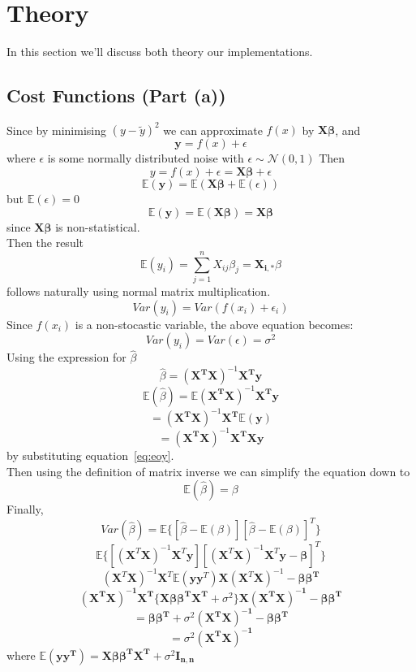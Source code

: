 \documentclass[sigconf, nonacm]{acmart}
\begin{document}
\section{Theory}
In this section we'll  discuss both theory our implementations.
\subsection{Cost Functions (Part (a))}
Since by minimising $ {(y- \tilde y)}^2 $ we can approximate $ f(x) $ by $ \textbf{X} \boldsymbol{\beta}  $, and
\[ \textbf{y} = f(x) + \epsilon \] where $ \epsilon $ is some normally distributed noise with $ \epsilon \sim \mathcal{N}(0,1)  $
Then 
\[ y = f(x) + \epsilon = \textbf{X} \boldsymbol{\beta} + \epsilon  \]  
\[ \mathbb{E}(\boldsymbol{y}) = \mathbb{E}(\boldsymbol{X \beta} + \mathbb{E}(\epsilon)) \] 
but $ \mathbb{E}(\epsilon) = 0 $ 
\[ \mathbb{E}(\boldsymbol{y}) = \mathbb{E}(\boldsymbol{X \beta}) = \boldsymbol{X \beta} \]
since $ \boldsymbol{X \beta} $ is non-statistical. \\
Then the result
\begin{equation}
	\label{eq:eoy}
	\mathbb{E}(y_i) = \sum_{j=1}^{n} X_{ij} \beta_j = \boldsymbol{X_{i,*}} \beta
\end{equation}
follows naturally using normal matrix multiplication. \\
\[ Var(y_i) = Var(f(x_i) + \epsilon_i) \] 
Since $ f(x_i) $ is a non-stocastic variable, the above equation becomes:
\begin{equation}
	Var(y_i) = Var(\epsilon) = \sigma^2
\end{equation}
Using the expression for $ \hat \beta $ 
\[ \hat \beta = {(\boldsymbol{X^{T}X})}^{-1} \boldsymbol{X^{T}y} \] 
\[ \mathbb{E}{(\hat \beta)} = \mathbb{E}{(\boldsymbol{X^{T}X})}^{-1} \boldsymbol{X^{T}y} \] 
\[ = {(\boldsymbol{X^{T}X})}^{-1} \boldsymbol{X^{T}} \mathbb{E}(\textbf{y}) \] 
\[ = {(\boldsymbol{X^{T}X})}^{-1} \boldsymbol{X^{T}Xy}  \] 
by substituting equation~\ref{eq:eoy}. \\
Then using the definition of matrix inverse we can simplify the equation down to
\[ \mathbb{E}(\hat \beta) = \beta \] 
Finally,
\[ Var(\hat \beta) = \mathbb{E}\{ [\hat \beta - \mathbb{E}(\beta)] {[\hat \beta - \mathbb{E}(\beta)]}^{T}\} \] 
\[ \mathbb{E}\{[(\boldsymbol{X}^{T}\boldsymbol{X})^{-1}\boldsymbol{X}^{T} \boldsymbol{y}] [(\textbf{X}^{T}\textbf{X})^{-1} \textbf{X}^{T}\textbf{y} - \boldsymbol{\beta}]^{T} \} \] 
	\[ (\textbf{X}^{T}\textbf{X} )^{-1} \textbf{X}^{T} \mathbb{E}(\textbf{y}\textbf{y}^{T}) \textbf{X} (\textbf{X}^{T}\textbf{X}    )^{-1} - \boldsymbol{\beta \beta^{T}}\] 
\[ \boldsymbol{ (X^{T}X)^{-1} X^{T} \{ X \beta \beta^{T} X^{T}} + \sigma^2\} \boldsymbol{X (X^{T}X)^{-1} - \beta \beta^{T} } \] 
\[ = \boldsymbol{\beta \beta^{T}} + \sigma^2 \boldsymbol{(X^{T}X)^{-1} - \beta \beta^{T} } \] 
\[ = \sigma^2 \boldsymbol{(X^{T}X)^{-1}} \] 
where $ \mathbb{E}(\boldsymbol{yy^{T}}) = \boldsymbol { X \beta \beta^{T} X^{T}} + \sigma^2 \mathbf{I_{n,n}}$ 
\end{document}

